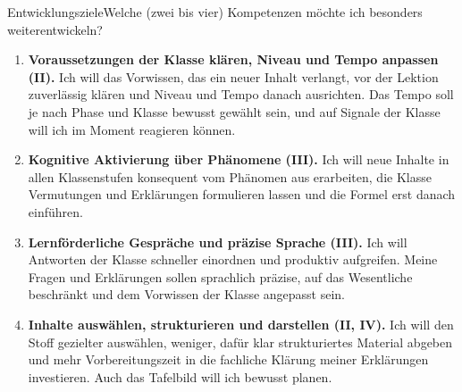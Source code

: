\documentclass[12pt,a4paper]{article}
\begin{document}
\begin{Formularfeld}{Entwicklungsziele}{Welche (zwei bis vier) Kompetenzen
möchte ich besonders weiterentwickeln?}

\begin{enumerate}
  \item \textbf{Voraussetzungen der Klasse klären, Niveau und Tempo
  anpassen (II).} Ich will das Vorwissen, das ein neuer Inhalt verlangt, vor
  der Lektion zuverlässig klären und Niveau und Tempo danach ausrichten. Das
  Tempo soll je nach Phase und Klasse bewusst gewählt sein, und auf Signale
  der Klasse will ich im Moment reagieren können.

  \item \textbf{Kognitive Aktivierung über Phänomene (III).} Ich will neue
  Inhalte in allen Klassenstufen konsequent vom Phänomen aus erarbeiten, die
  Klasse Vermutungen und Erklärungen formulieren lassen und die Formel erst
  danach einführen.

  \item \textbf{Lernförderliche Gespräche und präzise Sprache (III).} Ich will
  Antworten der Klasse schneller einordnen und produktiv aufgreifen. Meine
  Fragen und Erklärungen sollen sprachlich präzise, auf das Wesentliche
  beschränkt und dem Vorwissen der Klasse angepasst sein.

  \item \textbf{Inhalte auswählen, strukturieren und darstellen (II, IV).} Ich
  will den Stoff gezielter auswählen, weniger, dafür klar strukturiertes
  Material abgeben und mehr Vorbereitungszeit in die fachliche Klärung meiner
  Erklärungen investieren. Auch das Tafelbild will ich bewusst planen.
\end{enumerate}
\end{Formularfeld}
\end{document}
